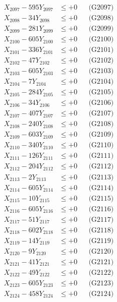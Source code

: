 \documentclass[a4paper,10pt]{article}
\begin{document}
{\begin{align}
X_{2097} - 595Y_{2097} &\leq +0 && \text{(G2097)} \\
X_{2098} - 34Y_{2098} &\leq +0 && \text{(G2098)} \\
X_{2099} - 281Y_{2099} &\leq +0 && \text{(G2099)} \\
X_{2100} - 605Y_{2100} &\leq +0 && \text{(G2100)} \\
\allowbreak
X_{2101} - 336Y_{2101} &\leq +0 && \text{(G2101)} \\
X_{2102} - 47Y_{2102} &\leq +0 && \text{(G2102)} \\
X_{2103} - 605Y_{2103} &\leq +0 && \text{(G2103)} \\
X_{2104} - 7Y_{2104} &\leq +0 && \text{(G2104)} \\
X_{2105} - 284Y_{2105} &\leq +0 && \text{(G2105)} \\
X_{2106} - 34Y_{2106} &\leq +0 && \text{(G2106)} \\
X_{2107} - 407Y_{2107} &\leq +0 && \text{(G2107)} \\
X_{2108} - 240Y_{2108} &\leq +0 && \text{(G2108)} \\
X_{2109} - 603Y_{2109} &\leq +0 && \text{(G2109)} \\
X_{2110} - 340Y_{2110} &\leq +0 && \text{(G2110)} \\
\allowbreak
X_{2111} - 126Y_{2111} &\leq +0 && \text{(G2111)} \\
X_{2112} - 204Y_{2112} &\leq +0 && \text{(G2112)} \\
X_{2113} - 2Y_{2113} &\leq +0 && \text{(G2113)} \\
X_{2114} - 605Y_{2114} &\leq +0 && \text{(G2114)} \\
X_{2115} - 10Y_{2115} &\leq +0 && \text{(G2115)} \\
X_{2116} - 605Y_{2116} &\leq +0 && \text{(G2116)} \\
X_{2117} - 51Y_{2117} &\leq +0 && \text{(G2117)} \\
X_{2118} - 602Y_{2118} &\leq +0 && \text{(G2118)} \\
X_{2119} - 14Y_{2119} &\leq +0 && \text{(G2119)} \\
X_{2120} - 9Y_{2120} &\leq +0 && \text{(G2120)} \\
\allowbreak
X_{2121} - 41Y_{2121} &\leq +0 && \text{(G2121)} \\
X_{2122} - 49Y_{2122} &\leq +0 && \text{(G2122)} \\
X_{2123} - 605Y_{2123} &\leq +0 && \text{(G2123)} \\
X_{2124} - 458Y_{2124} &\leq +0 && \text{(G2124)} \\

\end{align}}
\end{document}
